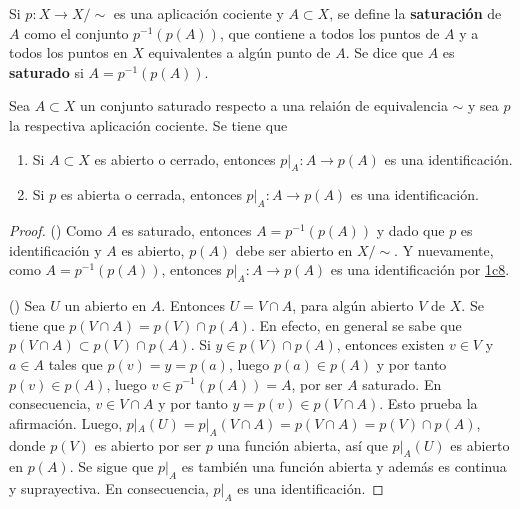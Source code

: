 

\begin{definition}
Si $p : X \longrightarrow X/\sim$ es una aplicación cociente y $A \subset X$, se define la \textbf{saturación} de $A$ como el conjunto $p^{-1}(p(A))$, que contiene a todos los puntos de $A$ y a todos los puntos en $X$ equivalentes a algún punto de $A$. Se dice que $A$ es \textbf{saturado} si $A = p^{-1}(p(A))$.
\end{definition}

\begin{proposition}
Sea $A \subset X$ un conjunto saturado respecto a una relaión de equivalencia $\sim$ y sea $p$ la respectiva aplicación cociente. Se tiene que
\begin{enumerate}[label=\textnormal{(\roman*)}]
\item Si $A \subset X$ es abierto o cerrado, entonces $p|_A : A \longrightarrow p(A)$ es una identificación.
\item Si $p$ es abierta o cerrada, entonces $p|_A : A \longrightarrow p(A)$ es una identificación.
\end{enumerate}
\end{proposition}

\begin{proof}
({\scshape{}}) Como $A$ es saturado, entonces $A = p^{-1}(p(A))$ y dado que $p$ es identificación y $A$ es abierto, $p(A)$ debe ser abierto en $X/\sim$. Y nuevamente, como $A = p^{-1}(p(A))$, entonces $p|_A : A \longrightarrow p(A)$ es una identificación por \hyperref[card:1c8]{\textsf{1c8}}.
\bigskip

({\scshape{}}) Sea $U$ un abierto en $A$. Entonces $U = V \cap A$, para algún abierto $V$ de $X$. Se tiene que $p(V \cap A) = p(V) \cap p(A)$. En efecto, en general se sabe que $p(V \cap A) \subset p(V) \cap p(A)$. Si $y \in p(V) \cap p(A)$, entonces existen $v \in V$ y $a \in A$ tales que $ p(v) = y = p(a)$, luego $p(a) \in p(A)$ y por tanto $p(v) \in p(A)$, luego $v \in p^{-1}(p(A)) = A$, por ser $A$ saturado. En consecuencia, $v \in V \cap A$ y por tanto $y = p(v) \in p(V \cap A)$. Esto prueba la afirmación. Luego, $p|_A(U) = p|_A(V \cap A) = p(V \cap A) = p(V) \cap p(A)$, donde $p(V)$ es abierto por ser $p$ una función abierta, así que $p|_A(U)$ es abierto en $p(A)$. Se sigue que $p|_A$ es también una función abierta y además es continua y suprayectiva. En consecuencia, $p|_A$ es una identificación.
\end{proof}
